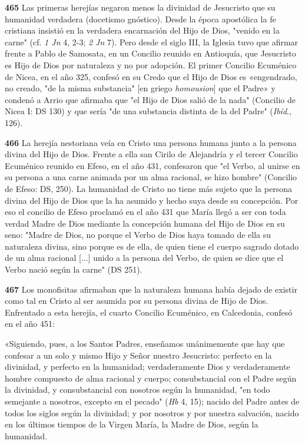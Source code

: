 \documentclass[]{article}
\begin{document}
\textbf{465} Las primeras herejías negaron menos la divinidad de
Jesucristo que su humanidad verdadera (docetismo gnóstico). Desde la
época apostólica la fe cristiana insistió en la verdadera encarnación
del Hijo de Dios, "venido en la carne" (cf. \emph{1 Jn} 4, 2-3; \emph{2
Jn} 7). Pero desde el siglo III, la Iglesia tuvo que afirmar frente a
Pablo de Samosata, en un Concilio reunido en Antioquía, que Jesucristo
es Hijo de Dios por naturaleza y no por adopción. El primer Concilio
Ecuménico de Nicea, en el año 325, confesó en su Credo que el Hijo de
Dios es «engendrado, no creado, "de la misma substancia" {[}en griego
\emph{homousion}{]} que el Padre» y condenó a Arrio que afirmaba que "el
Hijo de Dios salió de la nada" (Concilio de Nicea I: DS 130) y que sería
"de una substancia distinta de la del Padre" (\emph{Ibíd}., 126).

\textbf{466} La herejía nestoriana veía en Cristo una persona humana
junto a la persona divina del Hijo de Dios. Frente a ella san Cirilo de
Alejandría y el tercer Concilio Ecuménico reunido en Efeso, en el año
431, confesaron que "el Verbo, al unirse en su persona a una carne
animada por un alma racional, se hizo hombre" (Concilio de Efeso: DS,
250). La humanidad de Cristo no tiene más sujeto que la persona divina
del Hijo de Dios que la ha asumido y hecho suya desde su concepción. Por
eso el concilio de Efeso proclamó en el año 431 que María llegó a ser
con toda verdad Madre de Dios mediante la concepción humana del Hijo de
Dios en su seno: "Madre de Dios, no porque el Verbo de Dios haya tomado
de ella su naturaleza divina, sino porque es de ella, de quien tiene el
cuerpo sagrado dotado de un alma racional {[}...{]} unido a la persona
del Verbo, de quien se dice que el Verbo nació según la carne" (DS 251).

\textbf{467} Los monofisitas afirmaban que la naturaleza humana había
dejado de existir como tal en Cristo al ser asumida por su persona
divina de Hijo de Dios. Enfrentado a esta herejía, el cuarto Concilio
Ecuménico, en Calcedonia, confesó en el año 451:

«Siguiendo, pues, a los Santos Padres, enseñamos unánimemente que hay
que confesar a un solo y mismo Hijo y Señor nuestro Jesucristo: perfecto
en la divinidad, y perfecto en la humanidad; verdaderamente Dios y
verdaderamente hombre compuesto de alma racional y cuerpo;
consubstancial con el Padre según la divinidad, y consubstancial con
nosotros según la humanidad, "en todo semejante a nosotros, excepto en
el pecado" (\emph{Hb} 4, 15); nacido del Padre antes de todos los siglos
según la divinidad; y por nosotros y por nuestra salvación, nacido en
los últimos tiempos de la Virgen María, la Madre de Dios, según la
humanidad.
\end{document}
